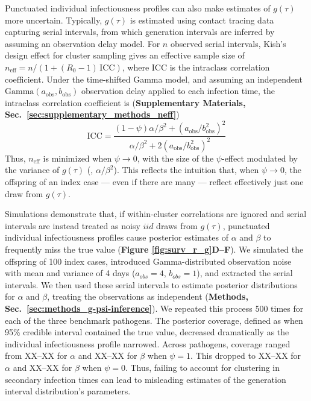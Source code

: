 Punctuated individual infectiousness profiles can also make estimates of $g(\tau)$ more uncertain. Typically, $g(\tau)$ is estimated using contact tracing data capturing serial intervals, from which generation intervals are inferred by assuming an observation delay model. For $n$ observed serial intervals, Kish's design effect for cluster sampling \citep{} gives an effective sample size of $n_{\text{eff}} = n / (1 +(R_0 - 1) \, \text{ICC})$, where ICC is the intraclass correlation coefficient. Under the time-shifted Gamma model, and assuming an independent $\text{Gamma}(a_\text{obs}, b_\text{obs})$ observation delay applied to each infection time, the intraclass correlation coefficient is ({\bf Supplementary Materials, Sec.~\ref{sec:supplementary_methods_neff}})
\begin{equation}
	\text{ICC} = \frac{
	(1 - \psi) \alpha / \beta^2 + (a_\text{obs} / b_\text{obs}^2)^2
	}{
	\alpha / \beta^2 + 2 (a_\text{obs} / b_\text{obs}^2)^2}
\end{equation}
Thus, $n_\text{eff}$ is minimized when $\psi \rightarrow 0$, with the size of the $\psi$-effect modulated by the variance of $g(\tau)$ (\ie, $\alpha / \beta^2$). This reflects the intuition that, when $\psi \rightarrow 0$, the offspring of an index case --- even if there are many --- reflect effectively just one draw from $g(\tau)$. 


Simulations demonstrate that, if within-cluster correlations are ignored and serial intervals are instead treated as noisy $iid$ draws from $g(\tau)$, punctuated individual infectiousness profiles cause posterior estimates of $\alpha$ and $\beta$ to frequently miss the true value ({\bf Figure \ref{fig:surv_r_g}D--F}). We simulated the offspring of 100 index cases, introduced Gamma-distributed observation noise with mean and variance of 4 days ($a_{obs} = 4$, $b_{obs} = 1$), and extracted the serial intervals. We then used these serial intervals to estimate posterior distributions for $\alpha$ and $\beta$, treating the observations as independent ({\bf Methods, Sec.~\ref{sec:methods_g-psi-inference}}). We repeated this process 500 times for each of the three benchmark pathogens. The posterior coverage, defined as when 95\% credible interval contained the true value, decreased dramatically as the individual infectiousness profile narrowed. Across pathogens, coverage ranged from XX--XX for $\alpha$ and XX--XX for $\beta$ when $\psi = 1$. This dropped to XX--XX for $\alpha$ and XX--XX for $\beta$ when $\psi = 0$. Thus, failing to account for clustering in secondary infection times can lead to misleading estimates of the generation interval distribution's parameters. 

